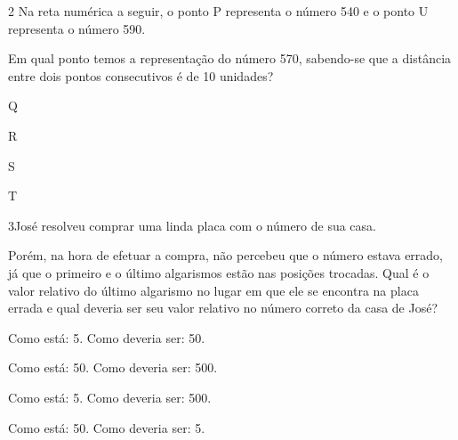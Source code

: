 \num{2} Na reta numérica a seguir, o ponto P representa o número 540 e o
ponto U representa o número 590.


Em qual ponto temos a representação do número 570, sabendo-se que a
distância entre dois pontos consecutivos é de 10 unidades?

\begin{escolha}
\item
  Q
\item
  R
\item
  S
\item
  T
\end{escolha}


\num{3}José resolveu comprar uma linda placa com o número de sua casa.


Porém, na hora de efetuar a compra, não percebeu que o número estava
errado, já que o primeiro e o último algarismos estão nas posições
trocadas. Qual é o valor relativo do último algarismo no lugar em que ele se
encontra na placa errada e qual deveria ser seu valor relativo no número
correto da casa de José?

\begin{escolha}
\item
  Como está: 5.
  Como deveria ser: 50.
\item
  Como está: 50.
  Como deveria ser: 500.
\item
  Como está: 5.
  Como deveria ser: 500.
\item
  Como está: 50.
  Como deveria ser: 5.
\end{escolha}

